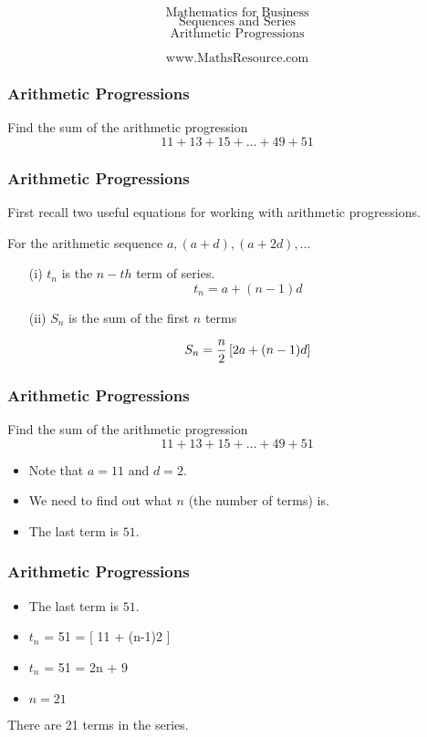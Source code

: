 \documentclass{beamer}
\begin{document}

\begin{frame}
\huge
\[ \mbox{ Mathematics for Business  }  \]
\[ \mbox{ Sequences and Series }  \]
\[ \mbox{ Arithmetic Progressions   }  \]

\Large
\[ \mbox{ www.MathsResource.com
  }  \]
\end{frame}

\begin{frame}
\frametitle{Arithmetic Progressions}
\Large
\vspace{-1.5cm}
Find the sum of the arithmetic progression
{
\LARGE
\[ 11 + 13 + 15 + \ldots + 49 + 51 \]
}
\end{frame}

\begin{frame}
\frametitle{Arithmetic Progressions}
\Large
\vspace{-0.5cm}
First recall two useful equations for working with arithmetic progressions.\\
\bigskip


For the arithmetic sequence $a,(a+d) ,(a+2d), \ldots$

\begin{itemize}
\item[(i)] $t_n$ is the $n-th$ term of series.\[ t_n= a+(n-1)d \]

\item[(ii)] $S_n$ is the sum of the first $n$ terms

\[ S_n  = {n \over 2} \left[ 2a+(n-1)d \right] \]
\end{itemize}
\end{frame}

\begin{frame}
\frametitle{Arithmetic Progressions}
\Large
Find the sum of the arithmetic progression
{
\[ 11 + 13 + 15 + \dots + 49 + 51 \]
}
\begin{itemize}
\item Note that $a=11$ and $d=2$.
\item We need to find out what $n$ (the number of terms) is.
\item The last term is $51$.
\end{itemize}
\end{frame}

\begin{frame}
\frametitle{Arithmetic Progressions}
\Large
\vspace{-2cm}
\begin{itemize}
\item The last term is $51$.
\item $t_n$ = 51 = [ 11 + (n-1)2 ] 
\item $t_n$ = 51 = 2n + 9
\item $n=21$
\end{itemize}
There are 21 terms in the series.
\end{frame}
\end{document}
